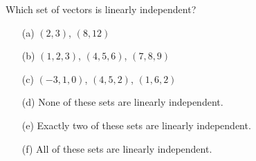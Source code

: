 \begin{problem}
    Which set of vectors is linearly independent?
    \begin{enumerate}
        \item[(a)] $(2,3)$, $(8,12)$
        \item[(b)] $(1,2,3)$, $(4,5,6)$, $(7,8,9)$
        \item[(c)] $(-3,1,0)$, $(4,5,2)$, $(1,6,2)$
        \item[(d)] None of these sets are linearly independent.
        \item[(e)] Exactly two of these sets are linearly independent.
        \item[(f)] All of these sets are linearly independent.
    \end{enumerate}
\end{problem}

%              


